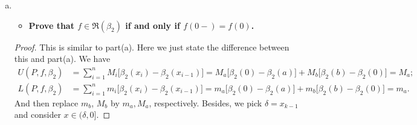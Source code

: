 \begin{Exercise}
\begin{enumerate}[(a)]
		\begin{itemize}
			\item \textbf{$\int f\,d\beta_1 = f(0)$ under the hypothesis.}
		\end{itemize}
		\begin{proof}
			By definition, we know
			$$
			L(P,f,\beta_1) \leq \int f\,d\beta_1 \leq U(P,f,\beta_1).
			$$
			We follow the notations from previous arguments.
			Thus we have
			\begin{align*}
			U(P,f,\beta_1) &= M_b \geq f(0); \\
			L(P,f,\beta_1) &= m_b \leq f(0).
			\end{align*}
			Given $\epsilon > 0$, it follows that
			\begin{align*}
			f(0)-\int f\,d\beta_1 \leq U(P,f,\beta_1) - L(P,f,\beta_1) < \epsilon; \\
			\int f\,d\beta_1-f(0) \leq U(P,f,\beta_1) - L(P,f,\beta_1) < \epsilon.
			\end{align*}
			Hence
			$$
			\left| \int f\,d\beta_1-f(0) \right| < \epsilon.
			$$
			Since $\epsilon$ was arbitrary, we conclude
			$$
			\int f\,d\beta_1 = f(0)
			$$
			as desired.
		\end{proof}
		
		\item
		\begin{itemize}
			\item \textbf{Prove that $f\in \mathfrak{R}(\beta_2)$ if and only if $f(0-) = f(0)$.}
		\end{itemize}
		\begin{proof}
			This is similar to part(a). Here we just state the difference between this and part(a). 
			We have
			\begin{align*}
			U(P,f,\beta_2)
			&= \sum_{i=1}^{n}M_i \big[ \beta_2(x_i) - \beta_2(x_{i-1}) \big]
			= M_a \big[ \beta_2(0) - \beta_2(a) \big] + M_b \big[ \beta_2(b) - \beta_2(0) \big]
			= M_a; \\
			L(P,f,\beta_2)
			&= \sum_{i=1}^{n}m_i \big[ \beta_2(x_i) - \beta_2(x_{i-1}) \big]
			= m_a \big[ \beta_2(0) - \beta_2(a) \big] + m_b \big[ \beta_2(b) - \beta_2(0) \big]
			= m_a.
			\end{align*}
			And then replace $m_b$, $M_b$ by $m_a, M_a$, respectively.
			Besides, we pick $\delta = x_{k-1}$ and consider $x\in (\delta, 0]$.
		\end{proof}
		

\end{enumerate}
\end{Exercise}
